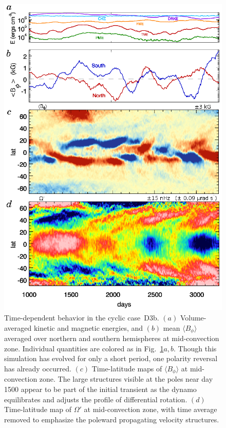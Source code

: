 \begin{figure}
  \begin{center}
    \includegraphics[width=0.8\linewidth]{figs/chapter_8/time_history_mmc_vturf_3_SC2.eps}
  \end{center}
  \caption[Time-dependent behavior in the cyclic case~D3b]
	  {Time-dependent behavior in the cyclic case~D3b.  $(a)$
	  Volume-averaged kinetic and magnetic energies, and 
	  $(b)$ mean $\langle B_\phi \rangle$ averaged over northern
	  and southern hemispheres at mid-convection zone.  Individual
          quantities are colored as in Fig.~\ref{fig:D3b}$a,b$.  Though
	  this simulation has evolved for only a short period, one
	  polarity reversal has already occurred.
	  $(c)$  Time-latitude maps of $\langle B_\phi \rangle$ at
	  mid-convection zone.  The large structures visible at the
	  poles near day 1500 appear to be part of the initial
	  transient as the dynamo equilibrates and adjusts the
	  profile of differential rotation.   
	  $(d)$   Time-latitude map of $\Omega'$ at mid-convection zone,
	  with time average removed to emphasize the poleward
	  propagating velocity structures. 
	  \label{fig:D3b}}
\end{figure}

